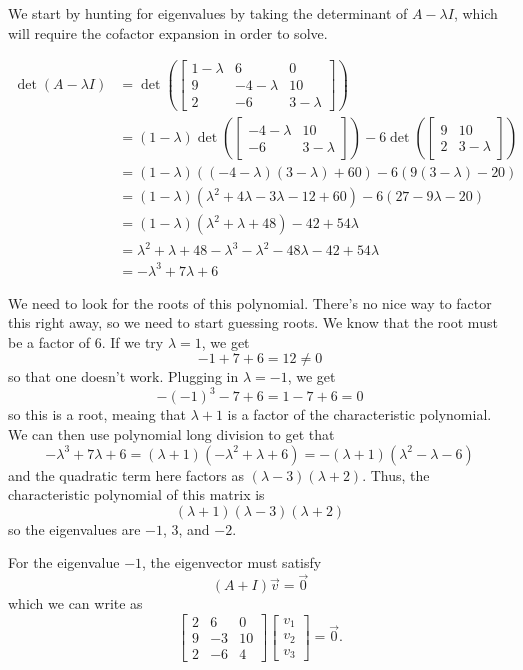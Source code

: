 \begin{exampleSol}
We start by hunting for eigenvalues by taking the determinant of $A - \lambda I$, which will require the cofactor expansion in order to solve.

\[ \begin{split}
\det(A - \lambda I) &= \det \left( \begin{bmatrix} 1-\lambda & 6 & 0 \\ 9 & -4-\lambda & 10 \\ 2 & -6 & 3-\lambda \end{bmatrix} \right) \\
&=(1-\lambda) \det\left( \begin{bmatrix} -4-\lambda & 10 \\ -6 & 3-\lambda \end{bmatrix} \right) - 6 \det \left( \begin{bmatrix} 9 & 10 \\ 2 & 3-\lambda \end{bmatrix} \right) \\
&= (1-\lambda)( (-4-\lambda)(3-\lambda) + 60) - 6 ( 9(3-\lambda) - 20) \\
&= (1-\lambda)(\lambda^2 + 4\lambda- 3\lambda - 12 + 60) - 6(27 - 9\lambda - 20) \\
&= (1-\lambda)(\lambda^2 + \lambda + 48) - 42 + 54\lambda \\
&= \lambda^2 + \lambda + 48 - \lambda^3 - \lambda^2 - 48 \lambda - 42 + 54\lambda \\
&= -\lambda^3 + 7\lambda + 6
\end{split}
\]

We need to look for the roots of this polynomial. There's no nice way to factor this right away, so we need to start guessing roots. We know that the root must be a factor of 6. If we try $\lambda = 1$, we get
\[ -1 + 7 + 6 = 12 \neq 0\] so that one doesn't work. Plugging in $\lambda = -1$, we get
\[ -(-1)^3 - 7 + 6 = 1 - 7 +6 = 0 \] so this is a root, meaing that $\lambda+1$ is a factor of the characteristic polynomial. We can then use polynomial long division to get that
\[ -\lambda^3 + 7\lambda + 6 = (\lambda+ 1)(-\lambda^2 + \lambda + 6) = -(\lambda+1)(\lambda^2 - \lambda - 6) \] and the quadratic term here factors as $(\lambda - 3)(\lambda+2)$. Thus, the characteristic polynomial of this matrix is
\[ (\lambda+1)(\lambda-3)(\lambda+2) \] so the eigenvalues are $-1$, $3$, and $-2$.

For the eigenvalue $-1$, the eigenvector must satisfy
\[ (A + I)\vec{v} = \vec{0} \] which we can write as
\[ \begin{bmatrix} 2 & 6 & 0 \\ 9 & -3 & 10 \\ 2 & -6 & 4 \end{bmatrix} \begin{bmatrix} v_1 \\ v_2 \\ v_3 \end{bmatrix} = \vec{0}. \]


\end{exampleSol}
